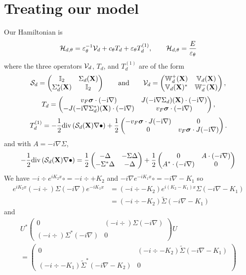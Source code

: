 \documentclass[11pt,a4paper,reqno,french,tikz]{amsart}
\newcommand{\pa}[1]{\left( #1 \right)} %
\let\p\relax\newcommand{\p}{\psi} %
\newcommand{\na}{\nabla} %
\newcommand{\f}[2]{\frac{#1}{#2}} %
\newcommand{\mat}[1]{\begin{pmatrix} #1 \end{pmatrix}} %
\newcommand{\bbV}{\mathbb{V}}
\def\bX{{\mathbf X}}
\def\bbI{{\mathbb I}}
\def\bbV{{\mathbb V}}
\def\bbW{{\mathbb W}}
\def\ri{{\rm i}}
\newcommand{\ept}{\varepsilon_\theta}
\def\bsigma{{\boldsymbol\sigma}}
\begin{document}
\section{Treating our model}


Our Hamiltonian is
\begin{equation} \label{eq:def:Sigma_d}
    \cH_{d, \theta} = \ept^{-1} \cV_d + c_\theta T_d + \ept T_d^{(1)},\qquad \cH_{d,\theta} \p = \frac{E}{\ept} \p
\end{equation}
where the three operators $\mathcal{V}_d$, $T_d$, and $T_d^{(1)}$ are of the form
\begin{align*}
\cS_d =  \begin{pmatrix}
        \bbI_2 & \Sigma_d(\bX) \\ \Sigma_d^*(\bX) & \bbI_2
    \end{pmatrix} \qquad \mbox{and} \qquad \cV_d = \begin{pmatrix}
        \bbW_d^+(\bX) & \bbV_d(\bX) \\
        \bbV_d(\bX)^* & \bbW_d^-(\bX)
    \end{pmatrix} ,
\end{align*}
\[
    T_d = \begin{pmatrix} v_F \bsigma \cdot ( - \ri \nabla) &  J ( - \ri \nabla \Sigma_d)(\bX) \cdot ( - \ri \nabla) \\
       -  J ( - \ri \nabla \Sigma_d^*)(\bX) \cdot ( - \ri \nabla) & v_F \bsigma \cdot ( - \ri \nabla) \end{pmatrix},
\]
\begin{equation} \label{eq:op_Td1}
    T_d^{(1)} = - \frac12 {\rm div} \left( \cS_d(\bX) \nabla \bullet \right) + \frac12 \begin{pmatrix}
        - v_F \bsigma \cdot J (- \ri \nabla) & 0 \\
        0 & v_F \bsigma \cdot J (- \ri \nabla) \end{pmatrix}.
\end{equation}
and with $A = -i\na \Sigma$,
\begin{align*}
	- \frac12 {\rm div} \left( \cS_d(\bX) \nabla \bullet \right) = \f 12 \mat{ -\Delta & -\Sigma \Delta \\ - \Sigma^* \Delta & - \Delta} + \f 12 \mat{0 & A \cdot \pa{-i\na} \\ A^* \cdot \pa{-i\na} & 0}
\end{align*}
We have $-i \div e^{iK_2 x} \circ = -i\div + K_2$ and $-i\na e^{-iK_1 x} \circ = -i\na - K_1$ so
\begin{align*}
	e^{iK_2 x} (-i \div) \Sigma (-i\na) e^{-iK_1 x} &= \pa{-i \div - K_2} e^{i (K_2 - K_1) x} \Sigma \pa{-i\na - K_1} \\
&= \pa{-i \div - K_2} \widetilde{\Sigma} \pa{-i\na - K_1}
\end{align*}
and
\begin{multline*}
	U^* \mat{0 & (-i \div) \Sigma (-i\na) \\ (-i \div) \Sigma^* (-i\na) & 0} U \\
	= \mat{0 &\pa{-i \div - K_2} \widetilde{\Sigma} \pa{-i\na - K_1} \\ \pa{-i \div - K_1} \widetilde{\Sigma}^* \pa{-i\na - K_2} & 0}
\end{multline*}
\end{document}
